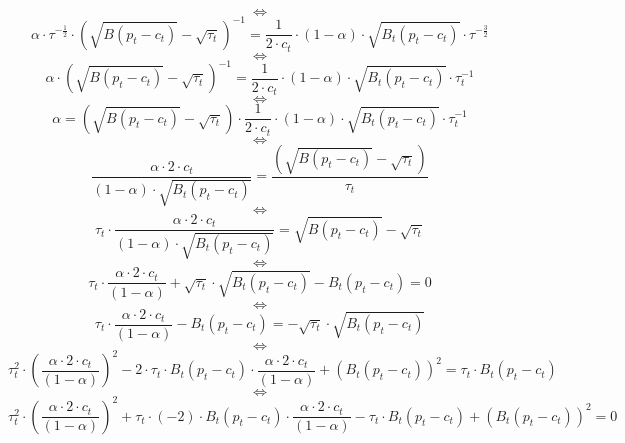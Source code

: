 \documentclass{article}
\begin{document}
$$\iff$$
\begin{equation*}
    \alpha\cdot \tau^{-\frac{1}{2}}\cdot \left(\sqrt{B(p_{t}-c_{t})}-\sqrt{\tau_{t}}\right)^{-1} = \frac{1}{2\cdot c_{t}}\cdot (1-\alpha)\cdot\sqrt{B_{t}(p_{t}-c_{t})}\cdot\tau^{-\frac{3}{2}} 
\end{equation*}
$$\iff$$
\begin{equation*}
    \alpha\cdot \left(\sqrt{B(p_{t}-c_{t})}-\sqrt{\tau_{t}}\right)^{-1} = \frac{1}{2\cdot c_{t}}\cdot (1-\alpha)\cdot\sqrt{B_{t}(p_{t}-c_{t})}\cdot\tau_{t}^{-1} 
\end{equation*}
$$\iff$$
\begin{equation*}
    \alpha = \left(\sqrt{B(p_{t}-c_{t})}-\sqrt{\tau_{t}}\right)\cdot \frac{1}{2\cdot c_{t}}\cdot (1-\alpha)\cdot\sqrt{B_{t}(p_{t}-c_{t})}\cdot\tau_{t}^{-1} 
\end{equation*}
$$\iff$$
\begin{equation*}
    \frac{\alpha \cdot 2\cdot c_{t}}{(1-\alpha)\cdot\sqrt{B_{t}(p_{t}-c_{t})}}= \frac{\left(\sqrt{B(p_{t}-c_{t})}-\sqrt{\tau_{t}}\right)}{\tau_{t}} 
\end{equation*}
$$\iff$$
\begin{equation*}
    \tau_{t}\cdot\frac{\alpha \cdot 2\cdot c_{t}}{(1-\alpha)\cdot\sqrt{B_{t}(p_{t}-c_{t})}}= \sqrt{B(p_{t}-c_{t})}-\sqrt{\tau_{t}} 
\end{equation*}
$$\iff$$
\begin{equation*}
    \tau_{t}\cdot\frac{\alpha \cdot 2\cdot c_{t}}{(1-\alpha)}+\sqrt{\tau_{t}}\cdot\sqrt{B_{t}(p_{t}-c_{t})}-B_{t}(p_{t}-c_{t})=0
\end{equation*}
$$\iff$$
\begin{equation*}
    \tau_{t}\cdot\frac{\alpha \cdot 2\cdot c_{t}}{(1-\alpha)}-B_{t}(p_{t}-c_{t})=-\sqrt{\tau_{t}}\cdot\sqrt{B_{t}(p_{t}-c_{t})}
\end{equation*}
$$\iff$$
\begin{equation*}
    \tau_{t}^{2}\cdot\left(\frac{\alpha \cdot 2\cdot c_{t}}{(1-\alpha)}\right)^{2}-2\cdot\tau_{t}\cdot B_{t}\left(p_{t}-c_{t}\right)\cdot \frac{\alpha \cdot 2\cdot c_{t}}{(1-\alpha)}+\left(B_{t}(p_{t}-c_{t})\right)^{2}={\tau_{t}}\cdot{B_{t}(p_{t}-c_{t})}
\end{equation*}
$$\iff$$
\begin{equation*}
    \tau_{t}^{2}\cdot\left(\frac{\alpha \cdot 2\cdot c_{t}}{(1-\alpha)}\right)^{2}+\tau_{t}\cdot(-2)\cdot B_{t}\left(p_{t}-c_{t}\right)\cdot \frac{\alpha \cdot 2\cdot c_{t}}{(1-\alpha)}-{\tau_{t}}\cdot{B_{t}(p_{t}-c_{t})}+\left(B_{t}(p_{t}-c_{t})\right)^{2}=0
\end{equation*}
\end{document}
